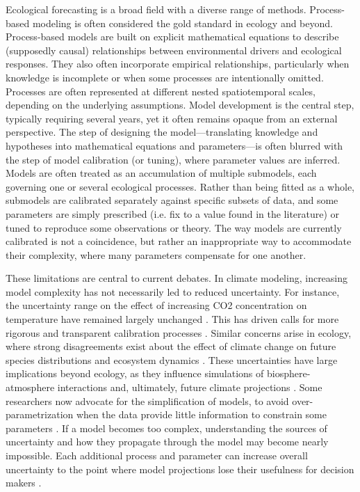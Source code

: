 \documentclass[11pt]{article}
\begin{document}
Ecological forecasting is a broad field with a diverse range of methods. Process-based modeling is often considered the gold standard in ecology \citep{Urban2016, Pilowsky2022} and beyond. Process-based models are built on explicit mathematical equations to describe (supposedly causal) relationships between environmental drivers and ecological responses. They also often incorporate empirical relationships, particularly when knowledge is incomplete or when some processes are intentionally omitted. Processes are often represented at different nested spatiotemporal scales, depending on the underlying assumptions. Model development is the central step, typically requiring several years, yet it often remains opaque from an external perspective. The step of designing the model---translating knowledge and hypotheses into mathematical equations and parameters---is often blurred with the step of model calibration (or tuning), where parameter values are inferred. Models are often treated as an accumulation of multiple submodels, each governing one or several ecological processes. Rather than being fitted as a whole, submodels are calibrated separately against specific subsets of data, and some parameters are simply prescribed (i.e. fix to a value found in the literature) or tuned to reproduce some observations or theory. The way models are currently calibrated is not a coincidence, %
but rather an inappropriate way to accommodate their complexity, where many parameters compensate for one another.

These limitations are central to current debates. In climate modeling, increasing model complexity has not necessarily led to reduced uncertainty. For instance, the uncertainty range on the effect of increasing CO2 concentration on temperature have remained largely unchanged \citep{Zelinka2020}. This has driven calls for more rigorous and transparent calibration processes \citep{balaji2022general}. Similar concerns arise in ecology, where strong disagreements exist about the effect of climate change on future species distributions \citep{Cheaib2012} and ecosystem dynamics \citep{Lovenduski2017}.
These uncertainties have large implications beyond ecology, as they influence simulations of biosphere-atmosphere interactions and, ultimately, future climate projections \citep{Bonan2018, simpson2025confronting}.
Some researchers now advocate for the simplification of models, to avoid over-parametrization when the data provide little information to constrain some parameters \citep{Wang2017, Harrison2021}. If a model becomes too complex, understanding the sources of uncertainty and how they propagate through the model may become nearly impossible.
Each additional process and parameter can increase overall uncertainty to the point where model projections lose their usefulness for decision makers \citep{Saltelli2020}.
\end{document}

